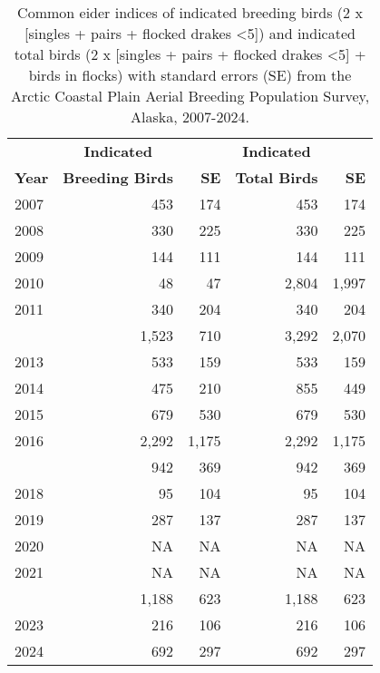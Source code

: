 \documentclass[
]{article}
\begin{document}
\begingroup\fontsize{10}{12}\selectfont

\begin{longtable}[t]{lrrrr}

\caption{\label{tbl-COEI}Common eider indices of indicated breeding
birds (2 x {[}singles + pairs + flocked drakes \textless5{]}) and
indicated total birds (2 x {[}singles + pairs + flocked drakes
\textless5{]} + birds in flocks) with standard errors (SE) from the
Arctic Coastal Plain Aerial Breeding Population Survey, Alaska,
2007-2024.}

\tabularnewline

\\
\toprule
\multicolumn{1}{c}{\textbf{ }} & \multicolumn{1}{c}{\textbf{Indicated}} & \multicolumn{1}{c}{\textbf{ }} & \multicolumn{1}{c}{\textbf{Indicated}} & \multicolumn{1}{c}{\textbf{ }} \\
\cmidrule(l{3pt}r{3pt}){2-2} \cmidrule(l{3pt}r{3pt}){4-4}
\textbf{Year} & \textbf{Breeding Birds} & \textbf{SE} & \textbf{Total Birds} & \textbf{SE}\\
\midrule
2007 & 453 & 174 & 453 & 174\\
2008 & 330 & 225 & 330 & 225\\
2009 & 144 & 111 & 144 & 111\\
2010 & 48 & 47 & 2,804 & 1,997\\
2011 & 340 & 204 & 340 & 204\\
\addlinespace
2012 & 1,523 & 710 & 3,292 & 2,070\\
2013 & 533 & 159 & 533 & 159\\
2014 & 475 & 210 & 855 & 449\\
2015 & 679 & 530 & 679 & 530\\
2016 & 2,292 & 1,175 & 2,292 & 1,175\\
\addlinespace
2017 & 942 & 369 & 942 & 369\\
2018 & 95 & 104 & 95 & 104\\
2019 & 287 & 137 & 287 & 137\\
2020 & NA & NA & NA & NA\\
2021 & NA & NA & NA & NA\\
\addlinespace
2022 & 1,188 & 623 & 1,188 & 623\\
2023 & 216 & 106 & 216 & 106\\
2024 & 692 & 297 & 692 & 297\\
\bottomrule

\end{longtable}

\endgroup{}
\end{document}
